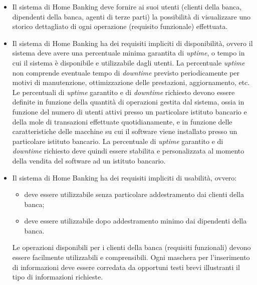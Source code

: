 \begin{itemize}
	\item Il sistema di Home Banking deve fornire ai suoi utenti (clienti della banca, dipendenti della banca, agenti di terze parti) la possibilit\`a di visualizzare uno storico dettagliato di ogni operazione (requisito funzionale) effettuata.

	\item Il sistema di Home Banking ha dei requisiti impliciti di disponibilit\`a, ovvero il sistema deve avere una percentuale minima garantita di \emph{uptime}, o tempo in cui il sistema \`e disponibile e utilizzabile dagli utenti.
	La percentuale \emph{uptime} non comprende eventuale tempo di \emph{downtime} previsto periodicamente per motivi di manutenzione, ottimizzazione delle prestazioni, aggiornamento, etc.
	Le percentuali di \emph{uptime} garantito e di \emph{downtime} richiesto devono essere definite in funzione della quantit\`a di operazioni gestita dal sistema, ossia in funzione del numero di utenti attivi presso un particolare istituto bancario e della mole di transazioni effettuate quotidianamente, e in funzione delle caratteristiche delle macchine su cui il software viene installato presso un particolare istituto bancario.
	La percentuale di \emph{uptime} garantito e di \emph{downtime} richiesto deve quindi essere stabilita e personalizzata al momento della vendita del software ad un istituto bancario.

	\item Il sistema di Home Banking ha dei requisiti impliciti di usabilit\`a, ovvero:
	\begin{itemize}
		\item deve essere utilizzabile senza particolare addestramento dai clienti della banca;
		\item deve essere utilizzabile dopo addestramento minimo dai dipendenti della banca.
	\end{itemize}
	Le operazioni disponibili per i clienti della banca (requisiti funzionali) devono essere facilmente utilizzabili e comprensibili.
	Ogni maschera per l'inserimento di informazioni deve essere corredata da opportuni testi brevi illustranti il tipo di informazioni richieste.
\end{itemize}

